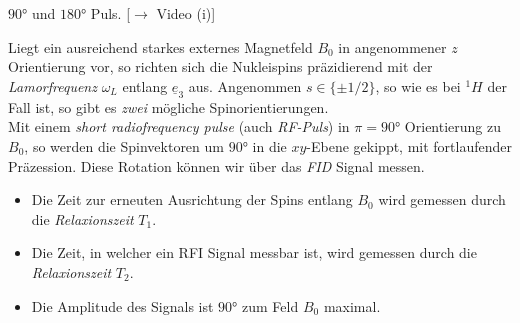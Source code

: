 \documentclass{subfiles}
\begin{document}
    \begin{Frage}
        $90\si\degree$ und $180\si\degree$ Puls. [$\to$ Video (i)]
    \end{Frage}
    \begin{Antwort}
        Liegt ein ausreichend starkes externes Magnetfeld $B_0$ in angenommener $z$ Orientierung vor, so richten sich die Nukleispins präzidierend mit der \emph{Lamorfrequenz} $\omega_L$ entlang $\underline e_3$ aus. Angenommen $s\in\{\pm 1/2\}$, so wie es bei $^1H$ der Fall ist, so gibt es \emph{zwei} mögliche Spinorientierungen. \\

        Mit einem \emph{short radiofrequency pulse} (auch \emph{RF-Puls}) in $\pi = 90\si\degree$ Orientierung zu $B_0$, so werden die Spinvektoren um $90\si\degree$ in die $xy$-Ebene gekippt, mit fortlaufender Präzession. Diese Rotation können wir über das \emph{FID} Signal messen.

        \begin{figure}[H]
            \centering
        \end{figure}
        \begin{itemize}[label=$\to$]
            \item Die Zeit zur erneuten Ausrichtung der Spins entlang $B_0$ wird gemessen durch die \emph{Relaxionszeit} $T_1$.
            \item Die Zeit, in welcher ein RFI Signal messbar ist, wird gemessen durch die \emph{Relaxionszeit} $T_2$.
            \item Die Amplitude des Signals ist $90\si\degree$ zum Feld $B_0$ maximal.
        \end{itemize}
    \end{Antwort}
\end{document}
